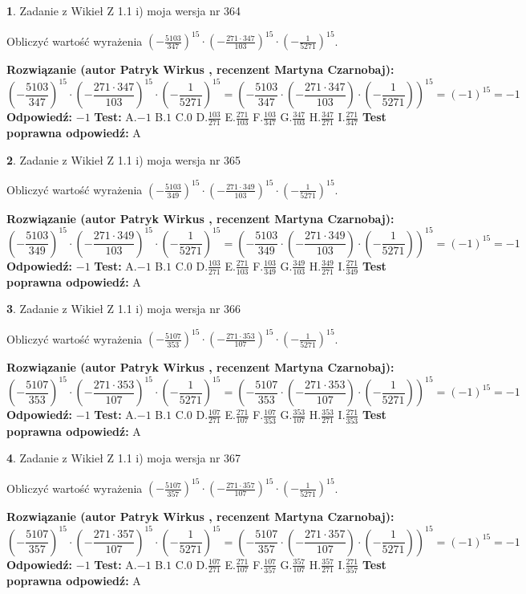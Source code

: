 \documentclass[12pt, a4paper]{article}
\theoremstyle{definition} %
\newtheorem{zad}{}
\newcommand{\zadStart}[1]{\begin{zad}#1\newline}
\newcommand{\zadStop}{\end{zad}}
\newcommand{\rozwStart}[2]{\noindent \textbf{Rozwiązanie (autor #1 , recenzent #2): }\newline}
\newcommand{\rozwStop}{\newline}
\newcommand{\odpStart}{\noindent \textbf{Odpowiedź:}\newline}
\newcommand{\odpStop}{\newline}
\newcommand{\testStart}{\noindent \textbf{Test:}\newline}
\newcommand{\testStop}{\newline}
\newcommand{\kluczStart}{\noindent \textbf{Test poprawna odpowiedź:}\newline}
\newcommand{\kluczStop}{\newline}
\begin{document}
\zadStart{Zadanie z Wikieł Z 1.1 i) moja wersja nr 364}

Obliczyć wartość wyrażenia $(-\frac{5103}{347})^{15} \cdot (-\frac{271 \cdot 347}{103})^{15} \cdot (-\frac{1}{5271})^{15}$.
\zadStop
\rozwStart{Patryk Wirkus}{Martyna Czarnobaj}
$$(-\frac{5103}{347})^{15} \cdot (-\frac{271 \cdot 347}{103})^{15} \cdot (-\frac{1}{5271})^{15} = (-\frac{5103}{347} \cdot (-\frac{271 \cdot 347}{103}) \cdot (-\frac{1}{5271}))^{15} = (-1)^{15} = -1$$
\rozwStop
\odpStart
$-1$
\odpStop
\testStart
A.$-1$ B.$1$ C.$0$ D.$\frac{103}{271}$ E.$\frac{271}{103}$
F.$\frac{103}{347}$ G.$\frac{347}{103}$
H.$\frac{347}{271}$
I.$\frac{271}{347}$
\testStop
\kluczStart
A
\kluczStop



\zadStart{Zadanie z Wikieł Z 1.1 i) moja wersja nr 365}

Obliczyć wartość wyrażenia $(-\frac{5103}{349})^{15} \cdot (-\frac{271 \cdot 349}{103})^{15} \cdot (-\frac{1}{5271})^{15}$.
\zadStop
\rozwStart{Patryk Wirkus}{Martyna Czarnobaj}
$$(-\frac{5103}{349})^{15} \cdot (-\frac{271 \cdot 349}{103})^{15} \cdot (-\frac{1}{5271})^{15} = (-\frac{5103}{349} \cdot (-\frac{271 \cdot 349}{103}) \cdot (-\frac{1}{5271}))^{15} = (-1)^{15} = -1$$
\rozwStop
\odpStart
$-1$
\odpStop
\testStart
A.$-1$ B.$1$ C.$0$ D.$\frac{103}{271}$ E.$\frac{271}{103}$
F.$\frac{103}{349}$ G.$\frac{349}{103}$
H.$\frac{349}{271}$
I.$\frac{271}{349}$
\testStop
\kluczStart
A
\kluczStop



\zadStart{Zadanie z Wikieł Z 1.1 i) moja wersja nr 366}

Obliczyć wartość wyrażenia $(-\frac{5107}{353})^{15} \cdot (-\frac{271 \cdot 353}{107})^{15} \cdot (-\frac{1}{5271})^{15}$.
\zadStop
\rozwStart{Patryk Wirkus}{Martyna Czarnobaj}
$$(-\frac{5107}{353})^{15} \cdot (-\frac{271 \cdot 353}{107})^{15} \cdot (-\frac{1}{5271})^{15} = (-\frac{5107}{353} \cdot (-\frac{271 \cdot 353}{107}) \cdot (-\frac{1}{5271}))^{15} = (-1)^{15} = -1$$
\rozwStop
\odpStart
$-1$
\odpStop
\testStart
A.$-1$ B.$1$ C.$0$ D.$\frac{107}{271}$ E.$\frac{271}{107}$
F.$\frac{107}{353}$ G.$\frac{353}{107}$
H.$\frac{353}{271}$
I.$\frac{271}{353}$
\testStop
\kluczStart
A
\kluczStop



\zadStart{Zadanie z Wikieł Z 1.1 i) moja wersja nr 367}

Obliczyć wartość wyrażenia $(-\frac{5107}{357})^{15} \cdot (-\frac{271 \cdot 357}{107})^{15} \cdot (-\frac{1}{5271})^{15}$.
\zadStop
\rozwStart{Patryk Wirkus}{Martyna Czarnobaj}
$$(-\frac{5107}{357})^{15} \cdot (-\frac{271 \cdot 357}{107})^{15} \cdot (-\frac{1}{5271})^{15} = (-\frac{5107}{357} \cdot (-\frac{271 \cdot 357}{107}) \cdot (-\frac{1}{5271}))^{15} = (-1)^{15} = -1$$
\rozwStop
\odpStart
$-1$
\odpStop
\testStart
A.$-1$ B.$1$ C.$0$ D.$\frac{107}{271}$ E.$\frac{271}{107}$
F.$\frac{107}{357}$ G.$\frac{357}{107}$
H.$\frac{357}{271}$
I.$\frac{271}{357}$
\testStop
\kluczStart
A
\kluczStop
\end{document}
